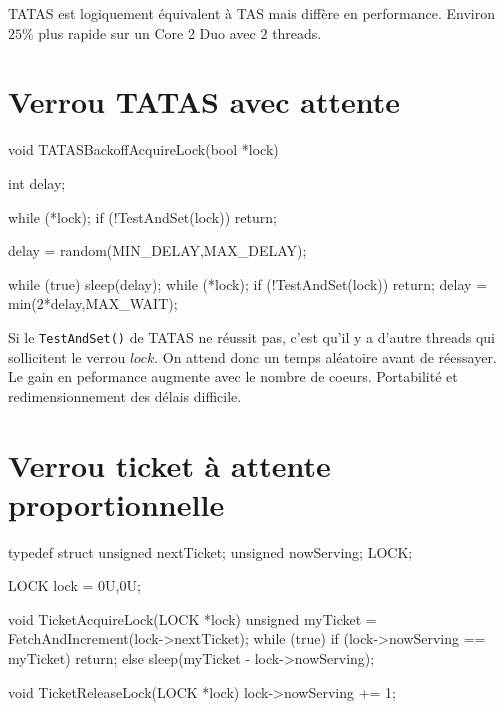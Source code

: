 \documentclass[11pt,a4paper]{report}
\begin{document}
TATAS est logiquement équivalent à TAS mais diffère en performance. Environ $25\%$ plus rapide sur un Core 2 Duo avec $2$ threads.


\section{Verrou TATAS avec attente} %
\label{sec:Verrou TATAS avec attente}

\begin{ccode}
    void TATASBackoffAcquireLock(bool *lock)
    {
        int delay;

        while (*lock);
            if (!TestAndSet(lock))
                return;

        delay = random(MIN_DELAY,MAX_DELAY);

        while (true)
        {
            sleep(delay);
            while (*lock);
                if (!TestAndSet(lock))
                    return;
            delay = min(2*delay,MAX_WAIT);
        }
    } 
\end{ccode}

Si le \texttt{TestAndSet()} de TATAS ne réussit pas, c'est qu'il y a d'autre threads qui sollicitent le verrou $lock$. On attend donc un temps aléatoire avant de réessayer. Le gain en peformance augmente avec le nombre de coeurs. Portabilité et redimensionnement des délais difficile.


\section{Verrou ticket à attente proportionnelle} %
\label{sec:Verrou ticket à attente proportionnelle}

\begin{ccode}
    typedef struct
    {
        unsigned nextTicket;
        unsigned nowServing;
    } LOCK;

    LOCK lock = {0U,0U};

    void TicketAcquireLock(LOCK *lock)
    {
        unsigned myTicket = FetchAndIncrement(lock->nextTicket);
        while (true)
            if (lock->nowServing == myTicket)
                return;
            else
                sleep(myTicket - lock->nowServing);
    }

    void TicketReleaseLock(LOCK *lock)
    {
        lock->nowServing += 1;
    } 
\end{ccode}
\end{document}
